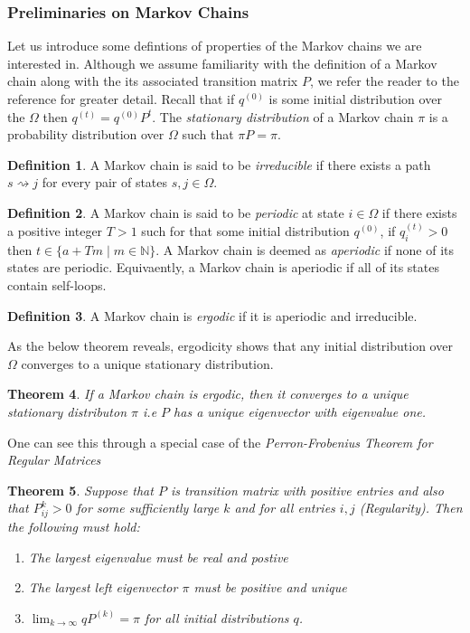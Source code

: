 \documentclass[12pt]{amsart}
\newtheorem{theorem}{Theorem}[section]
\theoremstyle{definition}
\newtheorem{definition}[theorem]{Definition}
\theoremstyle{remark}
\numberwithin{equation}{section}
\theoremstyle{remark}
\begin{document}
\subsubsection{Preliminaries on Markov Chains}
Let us introduce some defintions of properties of the Markov chains we are interested in. Although we assume familiarity with the definition of a Markov chain along with the its associated transition matrix $P$, we refer the reader to the reference \cite{cover} for greater detail. Recall that if $q^{(0)}$ is some initial  distribution over the $\Omega$ then $q^{(t)} = q^{(0)}P^t$. The \emph{stationary distribution} of a Markov chain $\pi$ is a probability distribution over $\Omega$ such that $\pi P = \pi$.
%
\begin{definition}
  A Markov chain is said to be \emph{irreducible} if there exists a path $s \rightsquigarrow j$ for every pair of states $s,j \in \Omega$.
\end{definition}
%
\begin{definition}
  A Markov chain is said to be \emph{periodic} at state $i \in \Omega$ if there exists a positive integer $T > 1$ such for that some initial distribution $q^(0)$, if $q_i^{(t)} > 0$ then $t \in \{a + Tm \mid m \in \mathbb{N}\}$. A Markov chain is deemed as \emph{aperiodic} if none of its states are periodic. Equivaently, a Markov chain is aperiodic if all of its states contain self-loops.
\end{definition}
%
\begin{definition}
  A Markov chain is \emph{ergodic} if it is aperiodic and irreducible.
\end{definition}
\noindent As the below theorem reveals, ergodicity shows that any initial distribution over $\Omega$ converges to a unique stationary distribution.
%
\begin{theorem}
  If a Markov chain is ergodic, then it converges to a unique stationary distributon $\pi$ i.e $P$ has a unique eigenvector with eigenvalue one.
\end{theorem}
%
\noindent One can see this through a special case of the \emph{Perron-Frobenius Theorem for Regular Matrices}
%
\begin{theorem} \label{perron}
  Suppose that $P$ is transition matrix with positive entries and also that $P_{ij}^{k} > 0$ for some sufficiently large $k$ and for all entries $i,j$ (Regularity). Then the following must hold:
  \begin{enumerate}
    \item The largest eigenvalue must be real and postive
    \item The largest left eigenvector $\pi$ must be positive and unique
    \item $\lim_{k \rightarrow \infty} qP^{(k)} = \pi$ for all initial distributions $q$.
  \end{enumerate}
\end{theorem}
\end{document}
